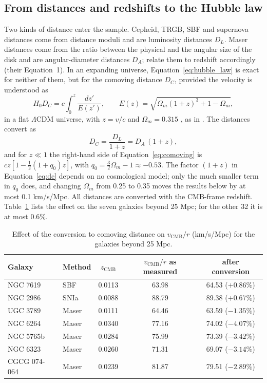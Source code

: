 \documentclass[11pt]{article}
\begin{document}
\subsection{From distances and redshifts to the Hubble law}
\label{sec:comoving}
Two kinds of distance enter the sample. Cepheid, TRGB, SBF and supernova distances come from distance moduli and are luminosity distances $D_L$. Maser distances come from the ratio between the physical and the angular size of the disk and are angular-diameter distances $D_A$; \citet{pesce2020} relate them to redshift accordingly (their Equation~1). In an expanding universe, Equation~\ref{eq:hubble_law} is exact for neither of them, but for the comoving distance $D_C$, provided the velocity is understood as
\begin{equation}
H_0 D_C = c\int_0^z \frac{dz'}{E(z')}, \qquad E(z) = \sqrt{\Omega_m (1+z)^3 + 1 - \Omega_m},
\label{eq:comoving}
\end{equation}
in a flat $\Lambda$CDM universe, with $z = v/c$ and $\Omega_m = 0.315$ \citep{planck2020}, as in \citet{pesce2020}. The distances convert as
\begin{equation}
D_C = \frac{D_L}{1+z} = D_A\,(1+z),
\label{eq:dc}
\end{equation}
and for $z \ll 1$ the right-hand side of Equation~\ref{eq:comoving} is $cz\left[1 - \tfrac{1}{2}(1+q_0)z\right]$, with $q_0 = \tfrac{3}{2}\Omega_m - 1 \approx -0.53$. The factor $(1+z)$ in Equation~\ref{eq:dc} depends on no cosmological model; only the much smaller term in $q_0$ does, and changing $\Omega_m$ from 0.25 to 0.35 moves the results below by at most 0.1 km/s/Mpc. All distances are converted with the CMB-frame redshift. Table~\ref{tab:comoving} lists the effect on the seven galaxies beyond 25 Mpc; for the other 32 it is at most 0.6\%.

\begin{table}[htbp]
\centering
\begin{tabular}{llccc}
\toprule
Galaxy & Method & $z_{\text{CMB}}$ & $v_{\text{CMB}}/r$ as measured & after conversion \\
\midrule
NGC 7619 & SBF & 0.0113 & 63.98 & 64.53 ($+0.86\%$) \\
NGC 2986 & SNIa & 0.0088 & 88.79 & 89.38 ($+0.67\%$) \\
UGC 3789 & Maser & 0.0111 & 64.46 & 63.59 ($-1.35\%$) \\
NGC 6264 & Maser & 0.0340 & 77.16 & 74.02 ($-4.07\%$) \\
NGC 5765b & Maser & 0.0284 & 75.99 & 73.39 ($-3.42\%$) \\
NGC 6323 & Maser & 0.0260 & 71.31 & 69.07 ($-3.14\%$) \\
CGCG 074-064 & Maser & 0.0239 & 81.87 & 79.51 ($-2.89\%$) \\
\bottomrule
\end{tabular}
\caption{Effect of the conversion to comoving distance on $v_{\text{CMB}}/r$ (km/s/Mpc) for the galaxies beyond 25 Mpc.}
\label{tab:comoving}
\end{table}
\end{document}
